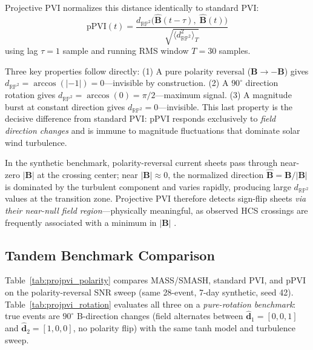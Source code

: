 \documentclass[12pt,letterpaper]{article}
\newcommand{\Bvec}{\mathbf{B}}
\newcommand{\Bhat}{\hat{\mathbf{B}}}
\newcommand{\pPVI}{\mathrm{pPVI}}
\begin{document}
Projective PVI normalizes this distance identically to standard PVI:
\begin{equation}
  \pPVI(t) =
  \frac{d_{\mathbb{RP}^2}\!\bigl(\Bhat(t-\tau),\;\Bhat(t)\bigr)}
       {\sqrt{\bigl\langle d_{\mathbb{RP}^2}^{2}\bigr\rangle_{T}}}
\end{equation}
using lag $\tau = 1$ sample and running RMS window $T = 30$ samples.

Three key properties follow directly:
(1) A pure polarity reversal ($\Bvec \to -\Bvec$) gives
$d_{\mathbb{RP}^2} = \arccos(|-1|) = 0$---invisible by construction.
(2) A $90^\circ$ direction rotation gives
$d_{\mathbb{RP}^2} = \arccos(0) = \pi/2$---maximum signal.
(3) A magnitude burst at constant direction gives
$d_{\mathbb{RP}^2} = 0$---invisible.
This last property is the decisive difference from standard PVI: $\pPVI$
responds exclusively to \emph{field direction changes} and is immune to
magnitude fluctuations that dominate solar wind turbulence.

In the synthetic benchmark, polarity-reversal current sheets pass through
near-zero $|\Bvec|$ at the crossing center; near $|\Bvec| \approx 0$, the
normalized direction $\Bhat = \Bvec/|\Bvec|$ is dominated by the turbulent
component and varies rapidly, producing large $d_{\mathbb{RP}^2}$ values at
the transition zone.
Projective PVI therefore detects sign-flip sheets \emph{via their near-null
field region}---physically meaningful, as observed HCS crossings are
frequently associated with a minimum in $|\Bvec|$ \citep{Wilcox1965}.

\subsection{Tandem Benchmark Comparison}
\label{subsec:projpvi_bench}

Table~\ref{tab:projpvi_polarity} compares MASS/SMASH, standard PVI, and
$\pPVI$ on the polarity-reversal SNR sweep (same 28-event, 7-day synthetic,
seed 42).
Table~\ref{tab:projpvi_rotation} evaluates all three on a
\emph{pure-rotation benchmark}: true events are $90^\circ$ B-direction changes
(field alternates between $\hat{\mathbf{d}}_1 = [0,0,1]$ and
$\hat{\mathbf{d}}_2 = [1,0,0]$, no polarity flip) with the same tanh model
and turbulence sweep.
\end{document}
